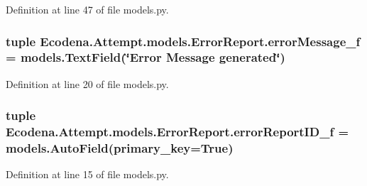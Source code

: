 Definition at line 47 of file models.py.

\hypertarget{class_ecodena_1_1_attempt_1_1models_1_1_error_report_ac3c6ddeb8bb514c31ef17a8b2c61fbbe}{
\subsubsection[{errorMessage\_\-f}]{\setlength{\rightskip}{0pt plus 5cm}tuple {\bf Ecodena.Attempt.models.ErrorReport.errorMessage\_\-f} = models.TextField(\char`\"{}Error Message generated\char`\"{})}}
\label{df/d02/class_ecodena_1_1_attempt_1_1models_1_1_error_report_ac3c6ddeb8bb514c31ef17a8b2c61fbbe}


Definition at line 20 of file models.py.

\hypertarget{class_ecodena_1_1_attempt_1_1models_1_1_error_report_a2af69996b9b6d05f1bdfeff5d05f1fc6}{
\subsubsection[{errorReportID\_\-f}]{\setlength{\rightskip}{0pt plus 5cm}tuple {\bf Ecodena.Attempt.models.ErrorReport.errorReportID\_\-f} = models.AutoField(primary\_\-key=True)}}
\label{df/d02/class_ecodena_1_1_attempt_1_1models_1_1_error_report_a2af69996b9b6d05f1bdfeff5d05f1fc6}


Definition at line 15 of file models.py.

\hypertarget{class_ecodena_1_1_attempt_1_1models_1_1_error_report_af26b1061aca87017c2a7297692ad08ac}{
\subsubsection[{errorType\_\-f}]{}}
\label{df/d02/class_ecodena_1_1_attempt_1_1models_1_1_error_report_af26b1061aca87017c2a7297692ad08ac}


